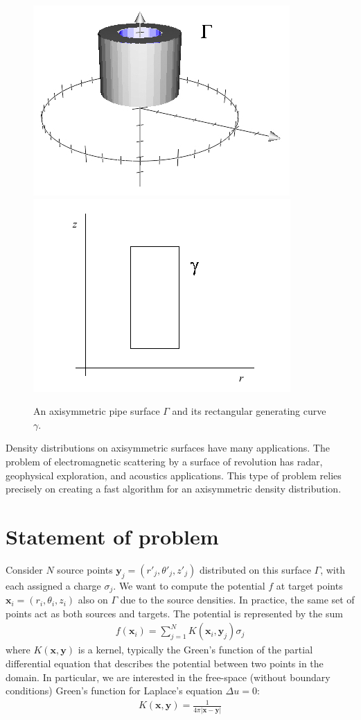 \documentclass[11pt, oneside]{article}   	%
\begin{document}
\begin{figure}[h]
\caption{An axisymmetric pipe surface $\Gamma$ and its rectangular generating curve $\gamma$.}
\label{fig:3}
\centering
\includegraphics[scale=0.5]{pipe2}
\includegraphics[scale=0.5]{rect}
\end{figure}

Density distributions on axisymmetric surfaces have many applications. The problem of electromagnetic scattering by a surface of revolution has radar, geophysical exploration, and acoustics applications. This type of problem relies precisely on creating a fast algorithm for an axisymmetric density distribution.

\section{Statement of problem}
Consider $N$ source points $\mathbf{y}_j=(r'_j,\theta'_j,z'_j)$ distributed on this surface $\Gamma$, with each assigned a charge $\sigma_j$. We want to compute the potential $f$ at target points $\mathbf{x}_i=(r_i,\theta_i,z_i)$ also on $\Gamma$ due to the source densities.  In practice, the same set of points act as both sources and targets. The potential is represented by the sum
\begin{align}
f(\mathbf{x}_i) = \sum_{j=1}^N K(\mathbf{x}_i,\mathbf{y}_j)\sigma_j
\end{align}
where $K(\mathbf{x},\mathbf{y})$ is a kernel, typically the Green's function of the partial differential equation that describes the potential between two points in the domain. In particular, we are interested in the free-space (without boundary conditions) Green's function for Laplace's equation $\Delta u = 0$:
\begin{align}
K(\mathbf{x},\mathbf{y}) = \frac{1}{4\pi |\mathbf{x}-\mathbf{y}|}
\end{align}
\end{document}
